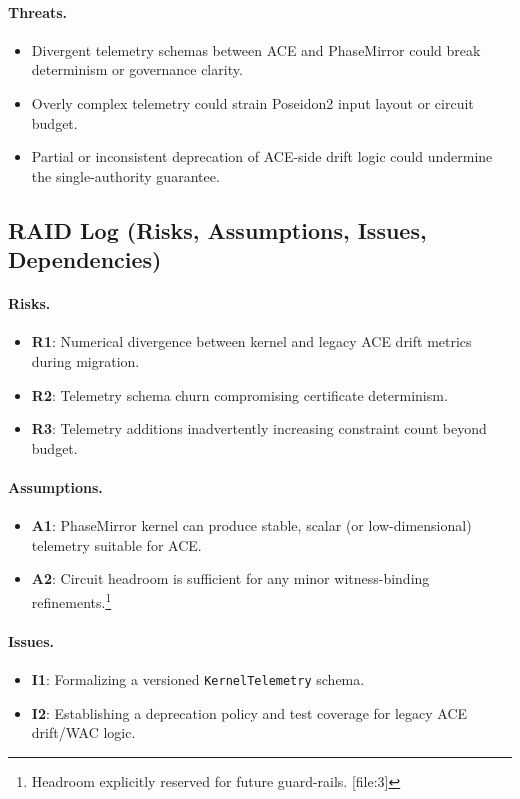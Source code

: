 \documentclass[11pt]{article}
\begin{document}
\paragraph{Threats.}
\begin{itemize}[leftmargin=*]
  \item Divergent telemetry schemas between ACE and PhaseMirror could break determinism or governance clarity.
  \item Overly complex telemetry could strain Poseidon2 input layout or circuit budget.
  \item Partial or inconsistent deprecation of ACE-side drift logic could undermine the single-authority guarantee.
\end{itemize}

\subsection{RAID Log (Risks, Assumptions, Issues, Dependencies)}

\paragraph{Risks.}
\begin{itemize}[leftmargin=*]
  \item \textbf{R1}: Numerical divergence between kernel and legacy ACE drift metrics during migration.
  \item \textbf{R2}: Telemetry schema churn compromising certificate determinism.
  \item \textbf{R3}: Telemetry additions inadvertently increasing constraint count beyond budget.
\end{itemize}

\paragraph{Assumptions.}
\begin{itemize}[leftmargin=*]
  \item \textbf{A1}: PhaseMirror kernel can produce stable, scalar (or low-dimensional) telemetry suitable for ACE.
  \item \textbf{A2}: Circuit headroom is sufficient for any minor witness-binding refinements.\footnote{Headroom explicitly reserved for future guard-rails. [file:3]}
\end{itemize}

\paragraph{Issues.}
\begin{itemize}[leftmargin=*]
  \item \textbf{I1}: Formalizing a versioned \texttt{KernelTelemetry} schema.
  \item \textbf{I2}: Establishing a deprecation policy and test coverage for legacy ACE drift/WAC logic.
\end{itemize}
\end{document}
